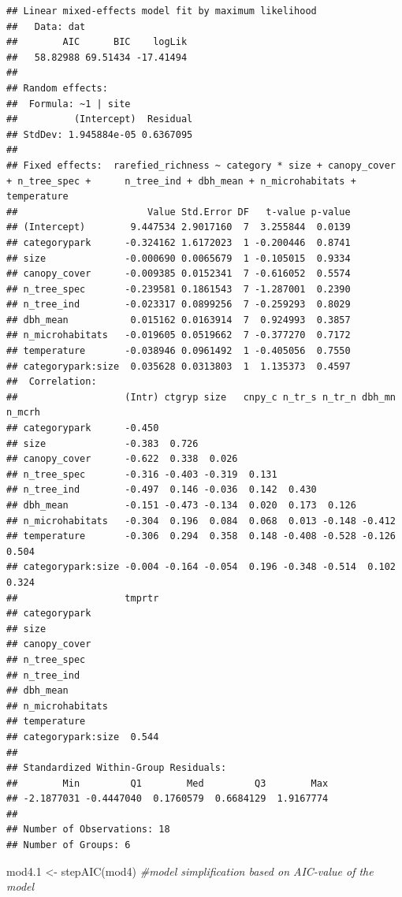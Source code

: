 \documentclass[
]{article}
\newenvironment{Shaded}{\begin{snugshade}}{\end{snugshade}}
\newcommand{\CommentTok}[1]{\textcolor[rgb]{0.56,0.35,0.01}{\textit{#1}}}
\newcommand{\FloatTok}[1]{\textcolor[rgb]{0.00,0.00,0.81}{#1}}
\newcommand{\FunctionTok}[1]{\textcolor[rgb]{0.00,0.00,0.00}{#1}}
\newcommand{\NormalTok}[1]{#1}
\newcommand{\OtherTok}[1]{\textcolor[rgb]{0.56,0.35,0.01}{#1}}
\begin{document}
\begin{verbatim}
## Linear mixed-effects model fit by maximum likelihood
##   Data: dat 
##        AIC      BIC    logLik
##   58.82988 69.51434 -17.41494
## 
## Random effects:
##  Formula: ~1 | site
##          (Intercept)  Residual
## StdDev: 1.945884e-05 0.6367095
## 
## Fixed effects:  rarefied_richness ~ category * size + canopy_cover + n_tree_spec +      n_tree_ind + dbh_mean + n_microhabitats + temperature 
##                       Value Std.Error DF   t-value p-value
## (Intercept)        9.447534 2.9017160  7  3.255844  0.0139
## categorypark      -0.324162 1.6172023  1 -0.200446  0.8741
## size              -0.000690 0.0065679  1 -0.105015  0.9334
## canopy_cover      -0.009385 0.0152341  7 -0.616052  0.5574
## n_tree_spec       -0.239581 0.1861543  7 -1.287001  0.2390
## n_tree_ind        -0.023317 0.0899256  7 -0.259293  0.8029
## dbh_mean           0.015162 0.0163914  7  0.924993  0.3857
## n_microhabitats   -0.019605 0.0519662  7 -0.377270  0.7172
## temperature       -0.038946 0.0961492  1 -0.405056  0.7550
## categorypark:size  0.035628 0.0313803  1  1.135373  0.4597
##  Correlation: 
##                   (Intr) ctgryp size   cnpy_c n_tr_s n_tr_n dbh_mn n_mcrh
## categorypark      -0.450                                                 
## size              -0.383  0.726                                          
## canopy_cover      -0.622  0.338  0.026                                   
## n_tree_spec       -0.316 -0.403 -0.319  0.131                            
## n_tree_ind        -0.497  0.146 -0.036  0.142  0.430                     
## dbh_mean          -0.151 -0.473 -0.134  0.020  0.173  0.126              
## n_microhabitats   -0.304  0.196  0.084  0.068  0.013 -0.148 -0.412       
## temperature       -0.306  0.294  0.358  0.148 -0.408 -0.528 -0.126  0.504
## categorypark:size -0.004 -0.164 -0.054  0.196 -0.348 -0.514  0.102  0.324
##                   tmprtr
## categorypark            
## size                    
## canopy_cover            
## n_tree_spec             
## n_tree_ind              
## dbh_mean                
## n_microhabitats         
## temperature             
## categorypark:size  0.544
## 
## Standardized Within-Group Residuals:
##        Min         Q1        Med         Q3        Max 
## -2.1877031 -0.4447040  0.1760579  0.6684129  1.9167774 
## 
## Number of Observations: 18
## Number of Groups: 6
\end{verbatim}

\begin{Shaded}
\begin{Highlighting}[]
\NormalTok{mod4}\FloatTok{.1} \OtherTok{\textless{}{-}} \FunctionTok{stepAIC}\NormalTok{(mod4) }\CommentTok{\#model simplification based on AIC{-}value of the model}
\end{Highlighting}
\end{Shaded}
\end{document}
